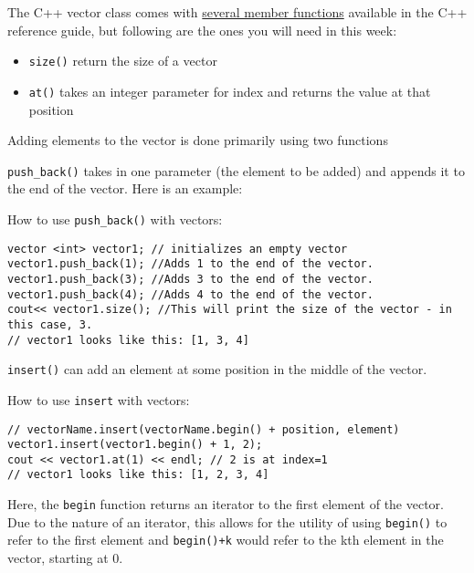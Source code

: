 The C++ vector class comes with \textcolor{cyan}{\href{https://www.cplusplus.com/reference/vector/vector/vector/}{several member functions}} available in the C++ reference guide, but following are the ones you will need in this week:

\begin{itemize}
    \item \texttt{size()} return the size of a vector
    \item \texttt{at()} takes an integer parameter for index and returns the value at that position
\end{itemize}

Adding elements to the vector is done primarily using two functions

\texttt{push_back()} takes in one parameter (the element to be added) and appends it to the end of the vector. Here is an example:

\begin{example}
    How to use \texttt{push_back()} with vectors:

    \begin{verbatim}
vector <int> vector1; // initializes an empty vector
vector1.push_back(1); //Adds 1 to the end of the vector. 
vector1.push_back(3); //Adds 3 to the end of the vector. 
vector1.push_back(4); //Adds 4 to the end of the vector. 
cout<< vector1.size(); //This will print the size of the vector - in this case, 3.
// vector1 looks like this: [1, 3, 4]
    \end{verbatim}
\end{example}

\texttt{insert()} can add an element at some position in the middle of the vector.

\begin{example}
    How to use \texttt{insert} with vectors:

    \begin{verbatim}
// vectorName.insert(vectorName.begin() + position, element)
vector1.insert(vector1.begin() + 1, 2);
cout << vector1.at(1) << endl; // 2 is at index=1
// vector1 looks like this: [1, 2, 3, 4]
    \end{verbatim}
\end{example}

Here, the \texttt{begin} function returns an iterator to the first element of the vector. Due to the nature of an iterator, this allows for the utility of using \texttt{begin()} to refer to the first element and \texttt{begin()+k} would refer to the kth element in the vector, starting at 0.

